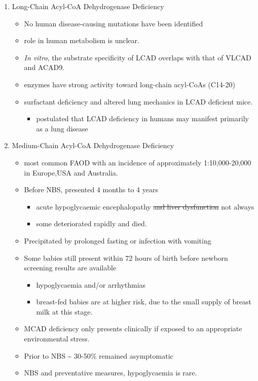 \documentclass{scrartcl}
\begin{document}
\begin{enumerate}
\item Long-Chain Acyl-CoA Dehydrogenase Deficiency
\label{sec:org55f9e02}
\begin{itemize}
\item No human disease-causing mutations have been identified
\item role  in  human  metabolism  is unclear.
\item \emph{In vitro}, the substrate specificity of LCAD overlaps with that of
VLCAD and ACAD9.
\item enzymes have strong activity toward long-chain acyl-CoAs (C14-20)
\item surfactant deficiency and altered lung mechanics in LCAD deficient
mice.
\begin{itemize}
\item postulated that LCAD deficiency in humans may manifest primarily
as a lung disease
\end{itemize}
\end{itemize}
\item Medium-Chain Acyl-CoA Dehydrogenase Deficiency
\label{sec:org1d5cc42}
\begin{itemize}
\item most common FAOD with an incidence of approximately 1:10,000-20,000
in Europe,USA and Australia.
\item Before NBS, presented 4 months to 4 years
\begin{itemize}
\item acute hypoglycaemic encephalopathy \sout{and liver dysfunction} not always
\item some deteriorated rapidly and died.
\end{itemize}
\item Precipitated by prolonged fasting or infection with vomiting
\item Some babies still present within 72 hours of birth before
newborn screening results are available
\begin{itemize}
\item hypoglycaemia and/or arrhythmias
\item breast-fed babies are at higher risk, due to the small supply of
breast milk at this stage.
\end{itemize}
\item MCAD deficiency only presents clinically if exposed to an
appropriate environmental stress.
\item Prior to NBS \textasciitilde{} 30-50\% remained asymptomatic
\item NBS and preventative measures, hypoglycaemia is rare.

\end{itemize}
\end{enumerate}
\end{document}
